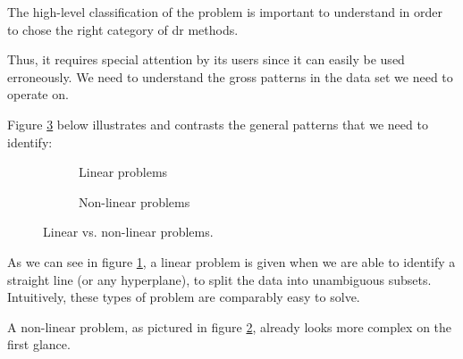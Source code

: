 The high-level classification of the problem is important to understand in order to chose the right category of \gls{dr} methods.

Thus, it requires special attention by its users since it can easily be used erroneously.
We need to understand the gross patterns in the data set we need to operate on.
\medskip

Figure \ref{fig:linearvsnonlinearproblems} below illustrates and contrasts the general patterns that we need to identify:\vspace*{4mm}

\renewcommand{\tikzscale}{1.18}
\begin{figure}[h]
	\begin{subfigure}{0.48\textwidth}
	    \caption{Linear problems}
		
	    \label{subfig:linearproblems}
	\end{subfigure}
	\hfill
	\begin{subfigure}{0.48\textwidth}
	    \caption{Non-linear problems}
		
	    \label{subfig:nonlinearproblems}
	\end{subfigure}
\caption{Linear vs. non-linear problems.}
\label{fig:linearvsnonlinearproblems}
\end{figure}

As we can see in figure \ref{subfig:linearproblems}, a linear problem is given when we are able to identify a straight line (or any \gls{hyperplane}), to split the data into unambiguous subsets.
Intuitively, these types of problem are comparably easy to solve.

A non-linear problem, as pictured in figure \ref{subfig:nonlinearproblems}, already looks more complex on the first glance.
